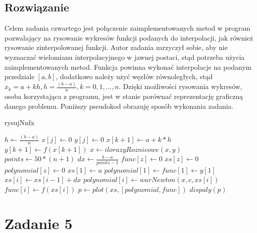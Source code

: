 \documentclass{article}
\begin{document}
\begin{center}
    \subsection{Rozwiązanie}
    \large Celem zadania czwartego jest połączenie zaimplementowanych metod w program pozwalający na rysowanie wykresów funkcji podanych do interpolacji, 
     jak również rysowanie zinterpolowanej funkcji. Autor zadania zarzyczył sobie, aby nie wyznaczać wielomianu interpolacyjnego w jawnej postaci, stąd potrzeba użycia zaimplementowanych metod.
     Funkcja powinna wykonać interpolacje na podanym przedziale \([a,b]\), dodatkowo należy użyć węzłów równoległych, stąd \(x_{k} = a + kh, h = \frac{(b-a)}{n}, k = 0,1,\dots,n\). \newline
     Dzięki możliwości rysowania wykresów, osoba korzystająca z programu, \newline jest w stanie porównać reprezentację graficzną danego problemu. \newline
     \newpage 
                            Poniższy pseudokod obrazuję sposób wykonania zadania.
    \begin{flushleft}
    \begin{algorithm}
    \caption{rysujNnfx}\label{alg:rysujNnfx}
    \begin{algorithmic}
    \State$h \gets \frac{(b-a)}{n}$
        \State$x[j] \gets 0$
        \State$y[j] \gets 0$
    \EndFor
        \State$x[k+1] \gets a +k*h$
        \State$y[k+1] \gets f(x[k+1])$
    \EndFor
    \State$x \gets ilorazyRoznicowe(x, y)$
    \State$points \gets 50*(n+1)$
    \State$dx \gets \frac{b-a}{points-1}$
        \State$func[z] \gets 0$
        \State$xs[z] \gets 0$
        \State$polynomial[z] \gets 0$
    \EndFor
    \State$xs[1] \gets a$
    \State$polynomial[1] \gets func[1] \gets y[1]$
        \State$xs[i] \gets xs[i-1] + dx$
        \State$ polynomial[i] \gets warNewton(x, c, xs[i])$
        \State$ func[i] \gets f(xs[i])$
    \EndFor
    \State$ p \gets plot(xs, [polynomial, func])$
    \State$ dispaly(p)$
    \EndFunction
    \end{algorithmic}
    \end{algorithm}
    \end{flushleft}
    
    \section{Zadanie 5}

\end{center}
\end{document}
